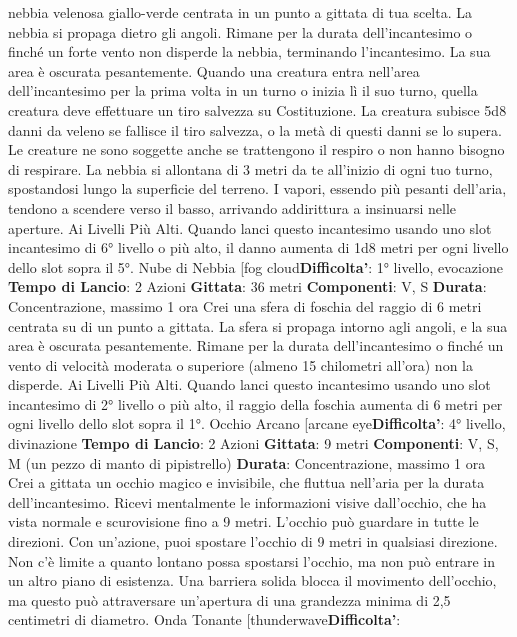 \begin{multicols}{2}
nebbia velenosa giallo-verde centrata in un punto a
gittata di tua scelta. La nebbia si propaga dietro gli
angoli. Rimane per la durata dell’incantesimo o finché
un forte vento non disperde la nebbia, terminando
l’incantesimo. La sua area è oscurata pesantemente.
Quando una creatura entra nell’area dell’incantesimo
per la prima volta in un turno o inizia lì il suo turno,
quella creatura deve effettuare un tiro salvezza su
Costituzione. La creatura subisce 5d8 danni da veleno
se fallisce il tiro salvezza, o la metà di questi danni se lo
supera. Le creature ne sono soggette anche se
trattengono il respiro o non hanno bisogno di respirare.
La nebbia si allontana di 3 metri da te all’inizio di ogni
tuo turno, spostandosi lungo la superficie del terreno. I
vapori, essendo più pesanti dell’aria, tendono a
scendere verso il basso, arrivando addirittura a
insinuarsi nelle aperture.
Ai Livelli Più Alti. Quando lanci questo incantesimo
usando uno slot incantesimo di 6° livello o più alto, il
danno aumenta di 1d8 metri per ogni livello dello slot
sopra il 5°.
Nube di Nebbia
[fog cloud\textbf{Difficolta'}:
1° livello, evocazione
\textbf{Tempo di Lancio}: 2 Azioni
\textbf{Gittata}: 36 metri
\textbf{Componenti}: V, S
\textbf{Durata}: Concentrazione, massimo 1 ora
Crei una sfera di foschia del raggio di 6 metri centrata
su di un punto a gittata. La sfera si propaga intorno agli
angoli, e la sua area è oscurata pesantemente. Rimane
per la durata dell’incantesimo o finché un vento di
velocità moderata o superiore (almeno 15 chilometri
all’ora) non la disperde.
Ai Livelli Più Alti. Quando lanci questo incantesimo
usando uno slot incantesimo di 2° livello o più alto, il
raggio della foschia aumenta di 6 metri per ogni livello
dello slot sopra il 1°.
Occhio Arcano
[arcane eye\textbf{Difficolta'}:
4° livello, divinazione
\textbf{Tempo di Lancio}: 2 Azioni
\textbf{Gittata}: 9 metri
\textbf{Componenti}: V, S, M (un pezzo di manto di pipistrello)
\textbf{Durata}: Concentrazione, massimo 1 ora
Crei a gittata un occhio magico e invisibile, che fluttua
nell’aria per la durata dell’incantesimo.
Ricevi mentalmente le informazioni visive dall’occhio,
che ha vista normale e scurovisione fino a 9 metri.
L’occhio può guardare in tutte le direzioni.
Con un’azione, puoi spostare l’occhio di 9 metri in
qualsiasi direzione. Non c’è limite a quanto lontano
possa spostarsi l’occhio, ma non può entrare in un altro
piano di esistenza. Una barriera solida blocca il
movimento dell’occhio, ma questo può attraversare
un’apertura di una grandezza minima di 2,5 centimetri
di diametro.
Onda Tonante
[thunderwave\textbf{Difficolta'}:

\end{multicols}
